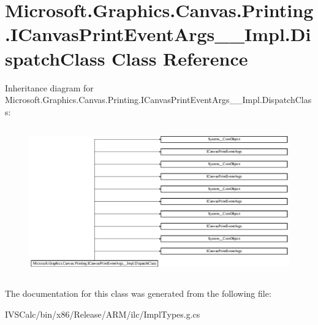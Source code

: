 \hypertarget{class_microsoft_1_1_graphics_1_1_canvas_1_1_printing_1_1_i_canvas_print_event_args_____impl_1_1_dispatch_class}{}\section{Microsoft.\+Graphics.\+Canvas.\+Printing.\+I\+Canvas\+Print\+Event\+Args\+\_\+\+\_\+\+Impl.\+Dispatch\+Class Class Reference}
\label{class_microsoft_1_1_graphics_1_1_canvas_1_1_printing_1_1_i_canvas_print_event_args_____impl_1_1_dispatch_class}
Inheritance diagram for Microsoft.\+Graphics.\+Canvas.\+Printing.\+I\+Canvas\+Print\+Event\+Args\+\_\+\+\_\+\+Impl.\+Dispatch\+Class\+:\begin{figure}[H]
\begin{center}
\leavevmode
\includegraphics[height=6.457023cm]{class_microsoft_1_1_graphics_1_1_canvas_1_1_printing_1_1_i_canvas_print_event_args_____impl_1_1_dispatch_class}
\end{center}
\end{figure}


The documentation for this class was generated from the following file\+:\begin{DoxyCompactItemize}
\item 
I\+V\+S\+Calc/bin/x86/\+Release/\+A\+R\+M/ilc/Impl\+Types.\+g.\+cs\end{DoxyCompactItemize}
